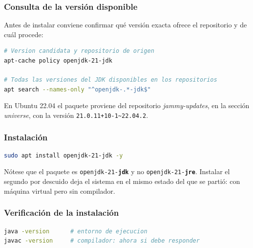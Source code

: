 
\subsubsection{Consulta de la versión disponible}

Antes de instalar conviene confirmar qué versión exacta ofrece el repositorio y de
cuál procede:

\begin{lstlisting}[language=bash,caption={Consulta de la versión candidata},morekeywords={apt-cache,policy,apt,search}]
# Version candidata y repositorio de origen
apt-cache policy openjdk-21-jdk

# Todas las versiones del JDK disponibles en los repositorios
apt search --names-only "^openjdk-.*-jdk$"
\end{lstlisting}

En Ubuntu 22.04 el paquete proviene del repositorio \textit{jammy-updates}, en la
sección \textit{universe}, con la versión \texttt{21.0.11+10-1\textasciitilde 22.04.2}.


\subsubsection{Instalación}

\begin{lstlisting}[language=bash,caption={Instalación del JDK},morekeywords={sudo,apt,install}]
sudo apt install openjdk-21-jdk -y
\end{lstlisting}

Nótese que el paquete es \texttt{openjdk-21-\textbf{jdk}} y no
\texttt{openjdk-21-\textbf{jre}}. Instalar el segundo por descuido deja el sistema en el
mismo estado del que se partió: con máquina virtual pero sin compilador.


\subsubsection{Verificación de la instalación}

\begin{lstlisting}[language=bash,caption={Comprobación de que el JDK quedó instalado},morekeywords={java,javac,version}]
java -version      # entorno de ejecucion
javac -version     # compilador: ahora si debe responder
\end{lstlisting}

